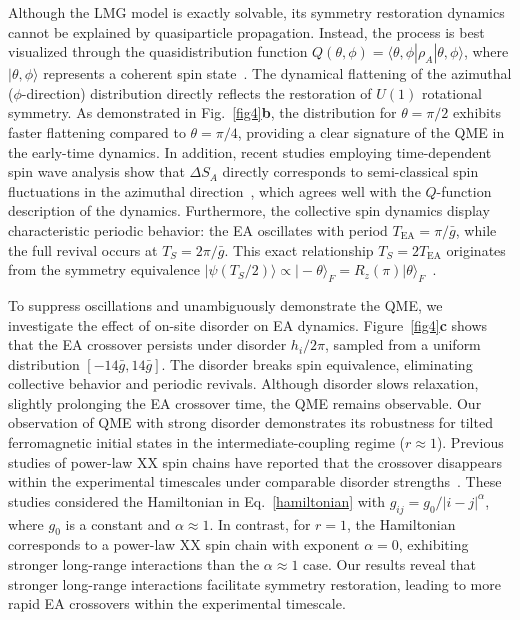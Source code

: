 \documentclass[reprint,superscriptaddress,preprintnumbers,longbibliography,
amsmath,amssymb,aps,floatfix,pra,twocolumn, tightenlines %
]{revtex4-2}
\begin{document}
    Although the LMG model is exactly solvable, its symmetry restoration dynamics cannot be explained by quasiparticle propagation. Instead, the process is best visualized through the quasidistribution function $Q(\theta,\phi) = \langle \theta,\phi | \rho_A | \theta,\phi \rangle$, where $|\theta,\phi\rangle$ represents a coherent spin state~\cite{2019_science}.
    The dynamical flattening of the azimuthal ($\phi$-direction) distribution directly reflects the restoration of $U(1)$ rotational symmetry. As demonstrated in Fig.~\ref{fig4}\textbf{b}, the distribution for $\theta = \pi/2$ exhibits faster flattening compared to $\theta = \pi/4$, providing a clear signature of the QME in the early-time dynamics. In addition, recent studies employing time-dependent spin wave analysis show that $\Delta S_A$ directly corresponds to semi-classical spin fluctuations in the azimuthal direction~\cite{QME_long_range_spin}, which agrees well with the $Q$-function description of the dynamics. Furthermore, the collective spin dynamics display characteristic periodic behavior: the EA oscillates with period $T_{\text{EA}} = \pi/\bar{g}$, while the full revival occurs at $T_S = 2\pi/\bar{g}$. This exact relationship $T_S = 2T_{\text{EA}}$ originates from the symmetry equivalence $|\psi(T_S/2)\rangle \propto |{-}\theta\rangle_F = R_z(\pi) |\theta\rangle_F$~\cite{supp_cite}. 

    To suppress oscillations and unambiguously demonstrate the QME, we investigate the effect of on-site disorder on EA dynamics. Figure~\ref{fig4}\textbf{c} shows that the EA crossover persists under disorder \( h_i/2\pi \), sampled from a uniform distribution \( [-14\bar{g}, 14\bar{g}] \). The disorder breaks spin equivalence, eliminating collective behavior and periodic revivals. Although disorder slows relaxation, slightly prolonging the EA crossover time, the QME remains observable. Our observation of QME with strong disorder demonstrates its robustness for tilted ferromagnetic initial states in the intermediate-coupling regime (\( r \approx 1 \)). Previous studies of power-law XX spin chains have reported that the crossover disappears within the experimental timescales under comparable disorder strengths~\cite{QME_trapped_ion}. These studies considered the Hamiltonian in Eq.~\eqref{hamiltonian} with \( g_{ij} = g_0 / |i - j|^\alpha \), where \( g_0 \) is a constant and \( \alpha \approx 1 \). In contrast, for \( r = 1 \), the Hamiltonian corresponds to a power-law XX spin chain with exponent \( \alpha = 0 \), exhibiting stronger long-range interactions than the \( \alpha \approx 1 \) case. Our results reveal that stronger long-range interactions facilitate symmetry restoration, leading to more rapid EA crossovers within the experimental timescale.
 
\end{document}
